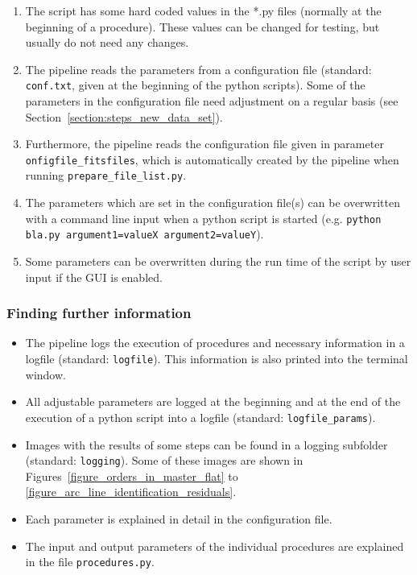 \documentclass[10pt,a4paper]{article}
\begin{document}
\begin{enumerate}
  \item The script has some hard coded values in the *.py files (normally at the beginning of a procedure). These values can be changed for testing, but usually do not need any changes.
  \item The pipeline reads the parameters from a configuration file (standard: \verb|conf.txt|, given at the beginning of the python scripts). Some of the parameters in the configuration file need adjustment on a regular basis (see Section~\ref{section:steps_new_data_set}).
  \item Furthermore, the pipeline reads the configuration file given in parameter \verb|onfigfile_fitsfiles|, which is automatically created by the pipeline when running \verb|prepare_file_list.py|.
  \item The parameters which are set in the configuration file(s) can be overwritten with a command line input when a python script is started (e.g. \verb|python bla.py argument1=valueX argument2=valueY|).
  \item Some parameters can be overwritten during the run time of the script by user input if the GUI is enabled.
\end{enumerate}

\subsubsection*{Finding further information}

\begin{itemize}
  \item The pipeline logs the execution of procedures and necessary information in a logfile (standard: \verb|logfile|). This information is also printed into the terminal window.
  \item All adjustable parameters are logged at the beginning and at the end of the execution of a python script into a logfile (standard: \verb|logfile_params|).
  \item Images with the results of some steps can be found in a logging subfolder (standard: \verb|logging|). Some of these images are shown in Figures~\ref{figure_orders_in_master_flat} to \ref{figure_arc_line_identification_residuals}.
  \item Each parameter is explained in detail in the configuration file.
  \item The input and output parameters of the individual procedures are explained in the file \verb|procedures.py|.
\end{itemize}
\end{document}
